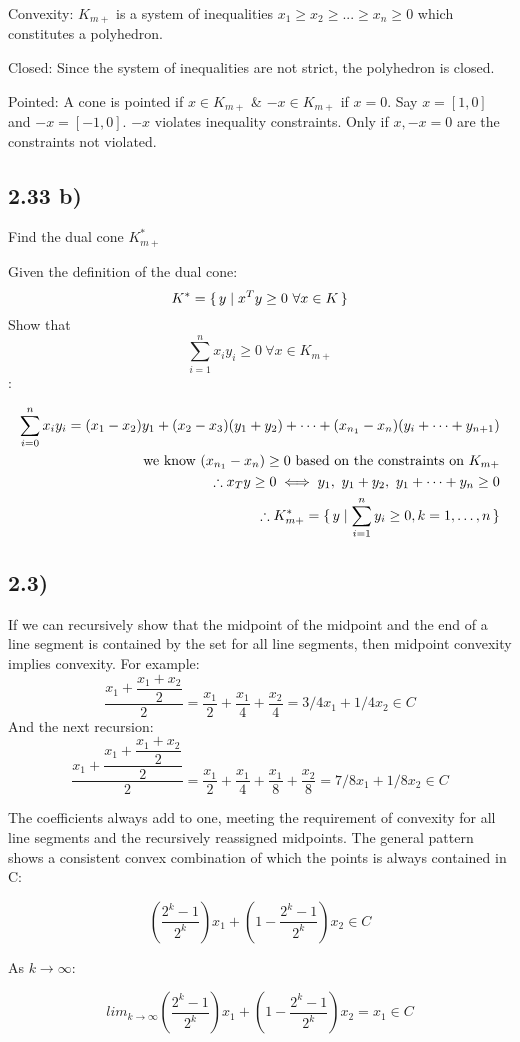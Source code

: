 \documentclass[12pt]{article}
\begin{document}
Convexity:
$K_{m+}$ is a system of inequalities $x_1 \ge x_2 \ge ... \ge x_n \ge 0$ which  constitutes a polyhedron.

Closed:
Since the system of inequalities are not strict, the polyhedron is closed.

Pointed:
A cone is pointed if $x \in K_{m+}$ \& $-x \in K_{m+}$ if $x = 0$.
Say $x = [1, 0]$ and $-x = [-1, 0]$. $-x$ violates inequality constraints. Only if $x, -x=0$ are the constraints not violated.


\subsection*{2.33 b)}
Find the dual cone $K_{m+}^*$

Given the definition of the dual cone:$$K^* = \set{y|x^Ty \ge 0\ \forall x \in K}$$ Show that $$\sum_{i=1}^{n}x_iy_i \ge 0\ \forall x \in K_{m+}$$:

\begin{align*}
\sum_{i=0}^{n}x_iy_i = (x_1 - x_2)y_1 + (x_2-x_3)(y_1 + y_2) + \dots + (x_{n_1}-x_n)(y_i + \dots + y_{n+1})\\
\text{we know $(x_{n_1}-x_n) \ge 0$ based on the constraints on $K_{m+}$}\\
\therefore x_Ty \ge 0 \iff y_1,\ y_1+y_2,\ y_1 + \dots + y_n \ge 0\\
\therefore K^*_{m+} = \set{y | \sum_{i=1}^{n} y_i \ge 0, k=1, \dots, n}
\end{align*}

\subsection*{2.3)}
If we can recursively show that the midpoint of the midpoint and the end of a line segment is contained by the set for all line segments, then midpoint convexity implies convexity.
For example:
$$\dfrac{x_1+\dfrac{x_1+x_2}{2}}{2} = \dfrac{x_1}{2}+\dfrac{x_1}{4}+\dfrac{x_2}{4} = 3/4x_1 + 1/4x_2\in C$$
And the next recursion:
$$\dfrac{x_1+\dfrac{x_1+\dfrac{x_1+x_2}{2}}{2}}{2} = \dfrac{x_1}{2}+\dfrac{x_1}{4}+\dfrac{x_1}{8} +\dfrac{x_2}{8} = 7/8x_1 +1/8x_2\in C$$

The coefficients always add to one, meeting the requirement of convexity for all line segments and the recursively reassigned midpoints. The general pattern shows a consistent convex combination of which the points is always contained in C:

$$(\dfrac{2^k-1}{2^k})x_1 +(1 - \dfrac{2^k-1}{2^k})x_2\in C$$

As $k \rightarrow \infty$:

$$lim_{k \rightarrow \infty} (\dfrac{2^k-1}{2^k})x_1 +(1 - \dfrac{2^k-1}{2^k})x_2 = x_1 \in C$$


 
\end{document}
